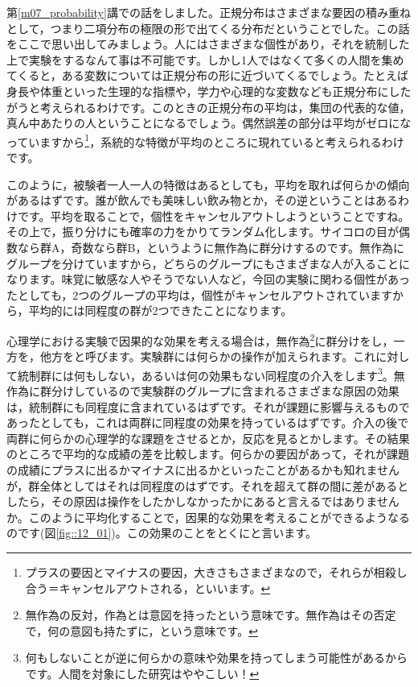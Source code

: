 \documentclass{ltjbook}
\begin{document}
第\ref{m07_probability}講での話をしました。正規分布はさまざまな要因の積み重ねとして，つまり二項分布の極限の形で出てくる分布だということでした。この話をここで思い出してみましょう。人にはさまざまな個性があり，それを統制した上で実験をするなんて事は不可能です。しかし1人ではなくて多くの人間を集めてくると，ある変数については正規分布の形に近づいてくるでしょう。たとえば身長や体重といった生理的な指標や，学力や心理的な変数なども正規分布にしたがうと考えられるわけです。このときの正規分布の平均は，集団の代表的な値，真ん中あたりの人ということになるでしょう。偶然誤差の部分は平均がゼロになっていますから\footnote{プラスの要因とマイナスの要因，大きさもさまざまなので，それらが相殺し合う＝キャンセルアウトされる，といいます。}，系統的な特徴が平均のところに現れていると考えられるわけです。

このように，被験者一人一人の特徴はあるとしても，平均を取れば何らかの傾向があるはずです。誰が飲んでも美味しい飲み物とか，その逆ということはあるわけです。平均を取ることで，個性をキャンセルアウトしようということですね。
その上で，振り分けにも確率の力をかりてランダム化します。サイコロの目が偶数なら群A，奇数なら群B，というように無作為に群分けするのです。無作為にグループを分けていますから，どちらのグループにもさまざまな人が入ることになります。味覚に敏感な人やそうでない人など，今回の実験に関わる個性があったとしても，2つのグループの平均は，個性がキャンセルアウトされていますから，平均的には同程度の群が2つできたことになります。

心理学における実験で因果的な効果を考える場合は，無作為\footnote{無作為の反対，作為とは意図を持ったという意味です。無作為はその否定で，何の意図も持たずに，という意味です。}に群分けをし，一方を，他方をと呼びます。実験群には何らかの操作が加えられます。これに対して統制群には何もしない，あるいは何の効果もない同程度の介入をします\footnote{何もしないことが逆に何らかの意味や効果を持ってしまう可能性があるからです。人間を対象にした研究はややこしい！}。無作為に群分けしているので実験群のグループに含まれるさまざまな原因の効果は，統制群にも同程度に含まれているはずです。それが課題に影響与えるものであったとしても，これは両群に同程度の効果を持っているはずです。介入の後で両群に何らかの心理学的な課題をさせるとか，反応を見るとかします。その結果のところで平均的な成績の差を比較します。何らかの要因があって，それが課題の成績にプラスに出るかマイナスに出るかといったことがあるかも知れませんが，群全体としてはそれは同程度のはずです。それを超えて群の間に差があるとしたら，その原因は操作をしたかしなかったかにあると言えるではありませんか。このように平均化することで，因果的な効果を考えることができるようなるのです(図\ref{fig::12_01})。この効果のことをとくにと言います。
\end{document}
